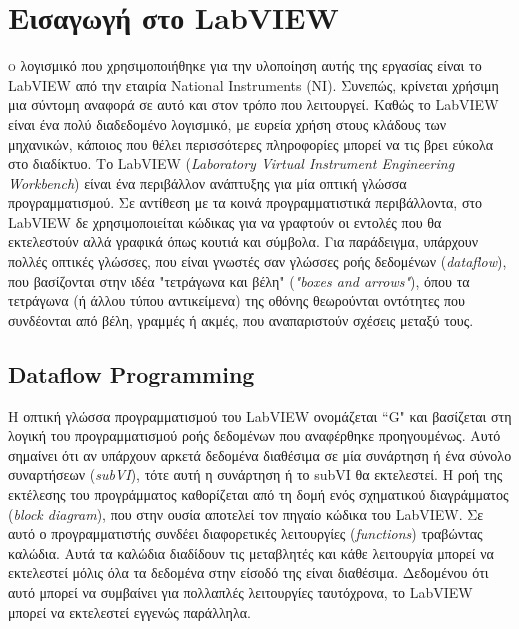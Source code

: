 


\section{Εισαγωγή στο LabVIEW}




\lettrine[findent=2pt]{}{ο} λογισμικό που χρησιμοποιήθηκε για την υλοποίηση αυτής της εργασίας είναι το LabVIEW από την εταιρία National Instruments (ΝΙ). Συνεπώς, κρίνεται χρήσιμη μια σύντομη αναφορά σε αυτό και στον τρόπο που λειτουργεί. Καθώς το LabVIEW είναι ένα πολύ διαδεδομένο λογισμικό, με ευρεία χρήση στους κλάδους των μηχανικών, κάποιος που θέλει περισσότερες πληροφορίες μπορεί να τις βρει εύκολα στο διαδίκτυο. 
Το LabVIEW (\emph{Laboratory Virtual Instrument Engineering Workbench}) είναι ένα περιβάλλον ανάπτυξης για μία οπτική γλώσσα προγραμματισμού. Σε αντίθεση με τα κοινά προγραμματιστικά περιβάλλοντα, στο LabVIEW δε χρησιμοποιείται κώδικας για να γραφτούν οι εντολές που θα εκτελεστούν αλλά γραφικά όπως κουτιά και σύμβολα. Για παράδειγμα, υπάρχουν πολλές οπτικές γλώσσες, που είναι γνωστές σαν γλώσσες ροής δεδομένων (\emph{dataflow}), που βασίζονται στην ιδέα "τετράγωνα και βέλη" (\emph{"boxes and arrows"}), όπου τα τετράγωνα (ή άλλου τύπου αντικείμενα) της οθόνης θεωρούνται οντότητες που συνδέονται από βέλη, γραμμές ή ακμές, που αναπαριστούν σχέσεις μεταξύ τους.

\subsection{Dataflow Programming}

Η οπτική γλώσσα προγραμματισμού του LabVIEW ονομάζεται ``G" και βασίζεται στη λογική του προγραμματισμού ροής δεδομένων που αναφέρθηκε προηγουμένως. Αυτό σημαίνει ότι αν υπάρχουν αρκετά δεδομένα διαθέσιμα σε μία συνάρτηση ή ένα σύνολο συναρτήσεων (\emph{subVI}), τότε αυτή η συνάρτηση ή το subVI θα εκτελεστεί. Η ροή της εκτέλεσης του προγράμματος καθορίζεται από τη δομή ενός σχηματικού διαγράμματος (\emph{block diagram}), που στην ουσία αποτελεί τον πηγαίο κώδικα του LabVIEW. Σε αυτό ο προγραμματιστής συνδέει διαφορετικές λειτουργίες (\emph{functions}) τραβώντας καλώδια. Αυτά τα καλώδια διαδίδουν τις μεταβλητές και κάθε λειτουργία μπορεί να εκτελεστεί μόλις όλα τα δεδομένα στην είσοδό της είναι διαθέσιμα. Δεδομένου ότι αυτό μπορεί να συμβαίνει για πολλαπλές λειτουργίες ταυτόχρονα, το LabVIEW μπορεί να εκτελεστεί εγγενώς παράλληλα.

